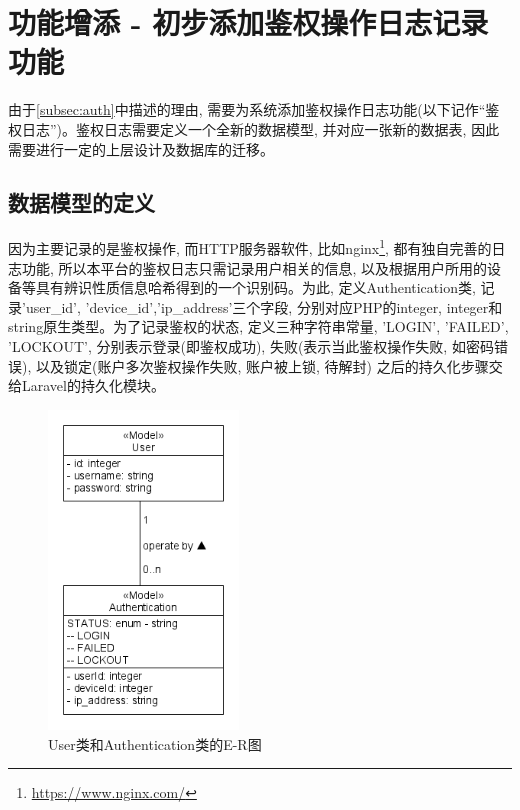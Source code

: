 \section{功能增添 - 初步添加鉴权操作日志记录功能}

由于\ref{subsec:auth}中描述的理由, 需要为系统添加鉴权操作日志功能(以下记作``鉴权日志'')。鉴权日志需要定义一个全新的数据模型, 并对应一张新的数据表, 因此需要进行一定的上层设计及数据库的迁移。

\subsection{数据模型的定义}

因为主要记录的是鉴权操作, 而HTTP服务器软件, 比如nginx\footnote{\url{https://www.nginx.com/}}, 都有独自完善的日志功能, 所以本平台的鉴权日志只需记录用户相关的信息, 以及根据用户所用的设备等具有辨识性质信息哈希得到的一个识别码。为此, 定义Authentication类, 记录'user\_id', 'device\_id','ip\_address'三个字段, 分别对应PHP的integer, integer和string原生类型。为了记录鉴权的状态, 定义三种字符串常量, 'LOGIN', 'FAILED', 'LOCKOUT', 分别表示登录(即鉴权成功), 失败(表示当此鉴权操作失败, 如密码错误), 以及锁定(账户多次鉴权操作失败, 账户被上锁, 待解封) 之后的持久化步骤交给Laravel的持久化模块。

\begin{figure}[h]
    \centering
    \includegraphics[width=0.45\textwidth]{support-files/4.6.1-authentication-model-png.png}
    \caption{User类和Authentication类的E-R图}
    \label{fig:userauthmodeler}
\end{figure}

